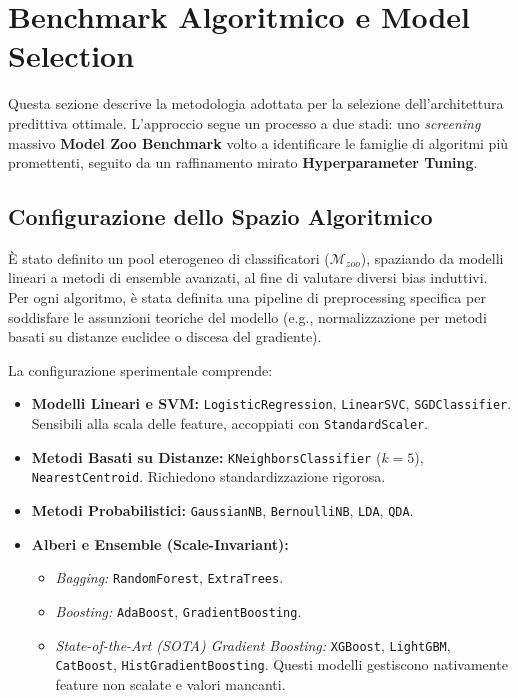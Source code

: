 \setcounter{figure}{0}
\renewcommand{\thefigure}{A.\arabic{figure}}
\setcounter{table}{0}
\renewcommand{\thetable}{A.\arabic{table}}

\section{Benchmark Algoritmico e Model Selection}
\label{app:model_benchmark}

Questa sezione descrive la metodologia adottata per la selezione dell'architettura predittiva ottimale. L'approccio segue un processo a due stadi: uno \textit{screening} massivo \textbf{Model Zoo Benchmark} volto a identificare le famiglie di algoritmi più promettenti, seguito da un raffinamento mirato \textbf{Hyperparameter Tuning}.

\subsection{Configurazione dello Spazio Algoritmico}

È stato definito un pool eterogeneo di classificatori ($\mathcal{M}_{zoo}$), spaziando da modelli lineari a metodi di ensemble avanzati, al fine di valutare diversi bias induttivi. Per ogni algoritmo, è stata definita una pipeline di preprocessing specifica per soddisfare le assunzioni teoriche del modello (e.g., normalizzazione per metodi basati su distanze euclidee o discesa del gradiente).

La configurazione sperimentale comprende:

\begin{itemize}
    \item \textbf{Modelli Lineari e SVM:} \texttt{LogisticRegression}, \texttt{LinearSVC}, \texttt{SGDClassifier}. Sensibili alla scala delle feature, accoppiati con \texttt{StandardScaler}.
    \item \textbf{Metodi Basati su Distanze:} \texttt{KNeighborsClassifier} ($k=5$), \texttt{NearestCentroid}. Richiedono standardizzazione rigorosa.
    \item \textbf{Metodi Probabilistici:} \texttt{GaussianNB}, \texttt{BernoulliNB}, \texttt{LDA}, \texttt{QDA}.
    \item \textbf{Alberi e Ensemble (Scale-Invariant):}
    \begin{itemize}
        \item \textit{Bagging:} \texttt{RandomForest}, \texttt{ExtraTrees}.
        \item \textit{Boosting:} \texttt{AdaBoost}, \texttt{GradientBoosting}.
        \item \textit{State-of-the-Art (SOTA) Gradient Boosting:} \texttt{XGBoost}, \texttt{LightGBM}, \texttt{CatBoost}, \texttt{HistGradientBoosting}. Questi modelli gestiscono nativamente feature non scalate e valori mancanti.
    \end{itemize}
\end{itemize}

